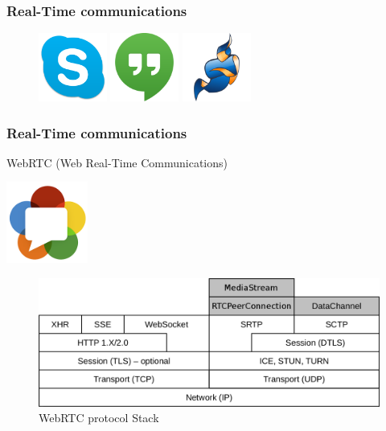 \documentclass[t]{beamer}
\begin{document}
		\begin{frame}[c]
		\frametitle{Real-Time communications}
		\begin{figure}
			\includegraphics[width=0.2\textwidth]{figures/skype.png}
			\includegraphics[width=0.2\textwidth]{figures/hangouts.png}
			\includegraphics[width=0.2\textwidth]{figures/jitsi.png}
		\end{figure}
		\end{frame}

		\begin{frame}[c]
		\frametitle{Real-Time communications}

		WebRTC (Web Real-Time Communications)

		\begin{flushright}
			\vspace*{-2\baselineskip}
			\includegraphics[width=0.2\textwidth]{figures/webrtc.png}
		\end{flushright}

		\begin{figure}[H]
			\vspace*{-2\baselineskip}
			\includegraphics[width=\textwidth]{figures/webrtc_stack2.png}
			\caption{WebRTC protocol Stack}
		\end{figure}
		\end{frame}
\end{document}
